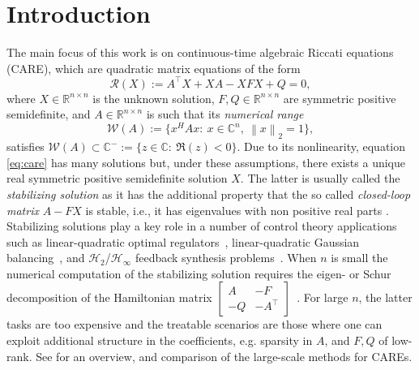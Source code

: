 \documentclass[a4paper,10pt]{article}
\newcommand{\norm}[1]{\left\lVert#1\right\rVert}
\newcommand{\upd}[1]{{\color{black}#1}} %
\begin{document}
	\section{Introduction}
The main focus of this work is on continuous-time algebraic Riccati equations (CARE), which are quadratic matrix equations of the form
\begin{equation}\label{eq:care}
\mathcal{R}(X) := A^\top X+XA- XFX+Q=0,	
\end{equation}
where $X\in\mathbb R^{n\times n}$ is the unknown solution, $F,Q\in\mathbb R^{n\times n}$ are symmetric positive semidefinite, and $A\in\mathbb R^{n\times n}$ is such that its \emph{numerical range} 
$$\mathcal W(A):=\{x^HAx:\ x\in\mathbb C^n,\ \norm{x}_2=1\},$$
satisfies $\mathcal W(A)\subset \mathbb C^{-}:=\{z\in\mathbb C:\ \Re(z)<0\}$.
Due to its nonlinearity, equation \eqref{eq:care} has many solutions but, under these assumptions, there exists a unique real symmetric positive semidefinite solution $X$. The latter is usually called the \emph{stabilizing solution} as it has the additional property that the so called \emph{closed-loop matrix} $A-FX$ is stable, i.e., it has eigenvalues with non positive real parts \cite[Theorem 2.18]{bini2011numerical}. Stabilizing solutions play a key role in a number of control theory applications such as linear-quadratic optimal regulators~\cite{sima, lancaster}, linear-quadratic Gaussian balancing~\cite{benner2009,breiten2015feedback}, and  $\mathcal H_2$/$\mathcal H_{\infty}$ feedback synthesis problems~\cite{alla2023,dolgov2023}. When $n$ is small the numerical computation of the stabilizing solution requires the eigen- or \upd{Schur} decomposition of the Hamiltonian matrix $\left[\begin{smallmatrix}
	A&-F\\ -Q&-A^\top 
\end{smallmatrix}\right]$~\cite{bini2011numerical}. For large $n$, the latter tasks are too expensive and the treatable scenarios are those where one can exploit additional structure in the coefficients, e.g. sparsity in $A$, and $F,Q$ of low-rank. See \cite{benner20} for an overview, and comparison of the large-scale methods for CAREs. 
\end{document}
